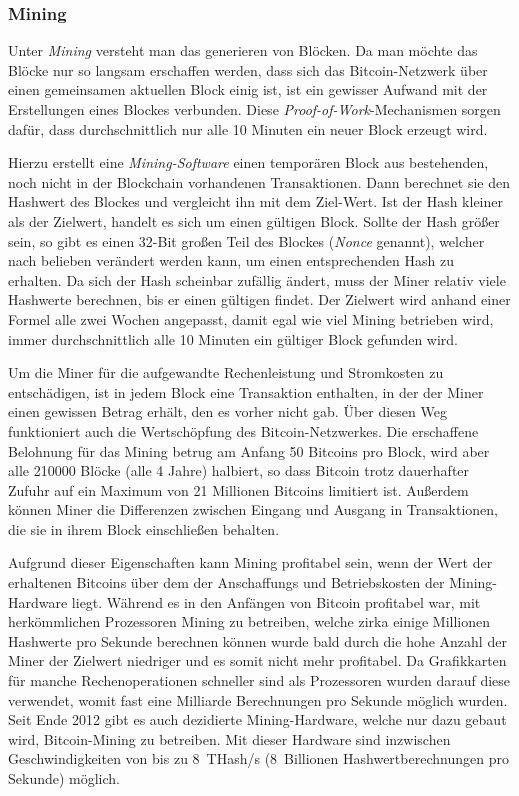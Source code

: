 \subsubsection{Mining}
\label{subsec:mining}

Unter \emph{Mining} versteht man das generieren von Blöcken.
Da man möchte das Blöcke nur so langsam erschaffen werden, dass sich das Bitcoin-Netzwerk über einen gemeinsamen aktuellen Block einig ist, ist ein gewisser Aufwand mit der Erstellungen eines Blockes verbunden.
Diese \emph{Proof-of-Work}-Mechanismen sorgen dafür, dass durchschnittlich nur alle 10 Minuten ein neuer Block erzeugt wird.

Hierzu erstellt eine \emph{Mining-Software} einen temporären Block aus bestehenden, noch nicht in der Blockchain vorhandenen Transaktionen.
Dann berechnet sie den Hashwert des Blockes und vergleicht ihn mit dem Ziel-Wert.
Ist der Hash kleiner als der Zielwert, handelt es sich um einen gültigen Block.
Sollte der Hash größer sein, so gibt es einen 32-Bit großen Teil des Blockes (\emph{Nonce} genannt), welcher nach belieben verändert werden kann, um einen entsprechenden Hash zu erhalten.
Da sich der Hash scheinbar zufällig ändert, muss der Miner relativ viele Hashwerte berechnen, bis er einen gültigen findet.
Der Zielwert wird anhand einer Formel alle zwei Wochen angepasst, damit egal wie viel Mining betrieben wird, immer durchschnittlich alle 10 Minuten ein gültiger Block gefunden wird.

Um die Miner für die aufgewandte Rechenleistung und Stromkosten zu entschädigen, ist in jedem Block eine Transaktion enthalten, in der der Miner einen gewissen Betrag erhält, den es vorher nicht gab.
Über diesen Weg funktioniert auch die Wertschöpfung des Bitcoin-Netzwerkes.
Die erschaffene Belohnung für das Mining betrug am Anfang 50 Bitcoins pro Block, wird aber alle 210000 Blöcke (alle 4 Jahre) halbiert, so dass Bitcoin trotz dauerhafter Zufuhr auf ein Maximum von 21 Millionen Bitcoins limitiert ist.
Außerdem können Miner die Differenzen zwischen Eingang und Ausgang in Transaktionen, die sie in ihrem Block einschließen behalten.

Aufgrund dieser Eigenschaften kann Mining profitabel sein, wenn der Wert der erhaltenen Bitcoins über dem der Anschaffungs und Betriebskosten der Mining-Hardware liegt.
Während es in den Anfängen von Bitcoin profitabel war, mit herkömmlichen Prozessoren Mining zu betreiben, welche zirka einige Millionen Hashwerte pro Sekunde berechnen können wurde bald durch die hohe Anzahl der Miner der Zielwert niedriger und es somit nicht mehr profitabel.
Da Grafikkarten für manche Rechenoperationen schneller sind als Prozessoren wurden darauf diese verwendet, womit fast eine Milliarde Berechnungen pro Sekunde möglich wurden.
Seit Ende 2012 gibt es auch dezidierte Mining-Hardware, welche nur dazu gebaut wird, Bitcoin-Mining zu betreiben.
Mit dieser Hardware sind inzwischen Geschwindigkeiten von bis zu 8~THash/s (8~Billionen Hashwertberechnungen pro Sekunde) möglich.

